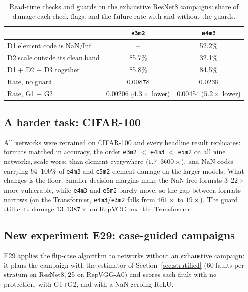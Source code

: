 \documentclass[12pt,a4paper]{article}
\newcommand{\fmt}[1]{\texttt{#1}}
\begin{document}
\begin{table}[H]
\centering
\caption{Read-time checks and guards on the exhaustive ResNet8 campaigns: share of damage each
check flags, and the failure rate with and without the guards.}
\label{tab:guards}
\small
\begin{tabular}{lcc}
\toprule
& \fmt{e3m2} & \fmt{e4m3} \\
\midrule
D1 element code is NaN/Inf                           & --     & 52.2\% \\
D2 scale outside its clean band                      & 85.7\% & 32.1\% \\
D1 + D2 + D3 together                                & 85.8\% & 84.5\% \\
\midrule
Rate, no guard                                       & 0.00878 & 0.0236 \\
Rate, G1 + G2                                        & 0.00206 ($4.3\times$ lower) & 0.00454 ($5.2\times$ lower) \\
\bottomrule
\end{tabular}
\end{table}

\subsection{A harder task: CIFAR-100}

All networks were retrained on CIFAR-100 and every headline result replicates: formats matched
in accuracy, the order \fmt{e3m2} $<$ \fmt{e4m3} $<$ \fmt{e5m2} on all nine networks, scale worse
than element everywhere ($1.7$--$3600\times$), and NaN codes carrying 94--100\% of \fmt{e4m3} and
\fmt{e5m2} element damage on the larger models. What changes is the floor. Smaller decision
margins make the NaN-free formats $3$--$22\times$ more vulnerable, while \fmt{e4m3} and \fmt{e5m2}
barely move, so the gap between formats narrows (on the Transformer, \fmt{e4m3}/\fmt{e3m2} falls
from $461\times$ to $19\times$). The guard still cuts damage $13$--$1387\times$ on RepVGG and the
Transformer.

\subsection{New experiment E29: case-guided campaigns}
\label{sec:e29}

E29 applies the flip-case algorithm to networks without an exhaustive campaign: it plans the
campaign with the estimator of Section~\ref{sec:stratified} (60 faults per stratum on ResNet8,
25 on RepVGG-A0) and scores each fault with no protection, with G1+G2, and with a NaN-zeroing
ReLU.
\end{document}
